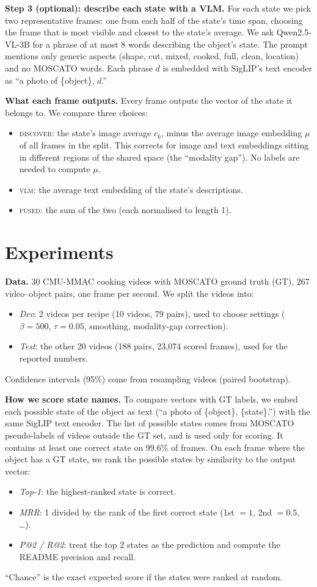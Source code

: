 \documentclass[10pt]{article}
\begin{document}
\textbf{Step 3 (optional): describe each state with a VLM.} For each state we pick two representative frames:
one from each half of the state's time span, choosing the frame that is most visible and closest to the
state's average. We ask Qwen2.5-VL-3B for a phrase of at most 8 words describing the object's state. The
prompt mentions only generic aspects (shape, cut, mixed, cooked, full, clean, location) and no MOSCATO words.
Each phrase $d$ is embedded with SigLIP's text encoder as ``a photo of \{object\}, $d$.''

\textbf{What each frame outputs.} Every frame outputs the vector of the state it belongs to. We compare three
choices:
\begin{itemize}
\item \textsc{discover}: the state's image average $c_k$, minus the average image embedding $\mu$ of all
frames in the split. This corrects for image and text embeddings sitting in different regions of the shared
space (the ``modality gap''). No labels are needed to compute $\mu$.
\item \textsc{vlm}: the average text embedding of the state's descriptions.
\item \textsc{fused}: the sum of the two (each normalised to length 1).
\end{itemize}

\section{Experiments}
\textbf{Data.} 30 CMU-MMAC cooking videos with MOSCATO ground truth (GT), 267 video--object pairs, one frame
per second. We split the videos into:
\begin{itemize}
\item \emph{Dev}: 2 videos per recipe (10 videos, 79 pairs), used to choose settings ($\beta=500$,
$\tau=0.05$, smoothing, modality-gap correction).
\item \emph{Test}: the other 20 videos (188 pairs, 23{,}074 scored frames), used for the reported numbers.
\end{itemize}
Confidence intervals (95\%) come from resampling videos (paired bootstrap).

\textbf{How we score state names.} To compare vectors with GT labels, we embed each possible state of the
object as text (``a photo of \{object\}, \{state\}.'') with the same SigLIP text encoder. The list of possible
states comes from MOSCATO pseudo-labels of videos outside the GT set, and is used only for scoring. It
contains at least one correct state on 99.6\% of frames. On each frame where the object has a GT state, we
rank the possible states by similarity to the output vector:
\begin{itemize}
\item \emph{Top-1}: the highest-ranked state is correct.
\item \emph{MRR}: 1 divided by the rank of the first correct state (1st $=1$, 2nd $=0.5$, \dots).
\item \emph{P@2 / R@2}: treat the top 2 states as the prediction and compute the README precision and recall.
\end{itemize}
``Chance'' is the exact expected score if the states were ranked at random.
\end{document}
